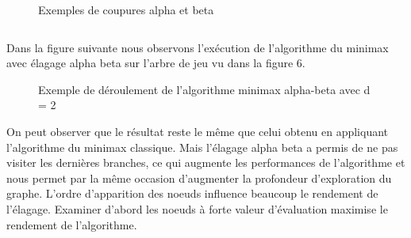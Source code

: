 \documentclass[11pt]{article}
\begin{document}
\begin{figure}[h]
  \caption {Exemples de coupures alpha et beta}
\end{figure}

{\noindent}{\noindent}\begin{tabular}{l}
 
\end{tabular}{\hspace*{\fill}}{\smallskip}

Dans la figure suivante nous observons l'exécution de l'algorithme du
minimax avec élagage alpha beta sur l'arbre de jeu vu dans la figure 6.


\begin{figure}[h]
  \caption {Exemple de déroulement de l'algorithme minimax alpha-beta avec d = 2}
\end{figure}

On peut observer que le résultat reste le même que celui obtenu en
appliquant l'algorithme du minimax classique. Mais l'élagage alpha beta a
permis de ne pas visiter les dernières branches, ce qui augmente les
performances de l'algorithme et nous permet par la même occasion
d'augmenter la profondeur d'exploration du graphe. L'ordre d'apparition des
noeuds influence beaucoup le rendement de l'élagage. Examiner d'abord les
noeuds à forte valeur d'évaluation maximise le rendement de
l'algorithme.
\end{document}
